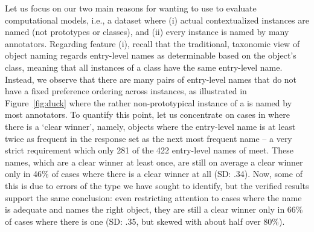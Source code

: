 Let us focus on our two main reasons for wanting to use \mn to evaluate computational models, i.e., a dataset where (i) actual contextualized instances are named (not prototypes or classes), and (ii) every instance is named by many annotators.
Regarding feature (i), recall that the traditional, taxonomic view of object naming regards entry-level names as determinable based on the object's class, meaning that all instances of a class have the same entry-level name. 
Instead, we observe that there are many pairs of entry-level names that do not have a fixed preference ordering across instances, as illustrated in Figure~\ref{fig:duck} where the rather non-prototypical instance of a  is named  by most annotators.
To quantify this point, let us concentrate on cases in \mn where there is a `clear winner', namely, objects where the entry-level name is at least twice as frequent in the response set as the next most frequent name -- a very strict requirement which only 281 of the 422 entry-level names of \mn meet.
These names, which are a clear winner at least once, are still on average a clear winner only in 46\% of cases where there is a clear winner at all (SD: .34).
Now, some of this is due to errors of the type we have sought to identify, but the verified results support the same conclusion: 
even restricting attention to cases where the name is adequate and names the right object, they are still a clear winner only in 66\% of cases where there is one (SD: .35, but skewed with about half over 80\%).


